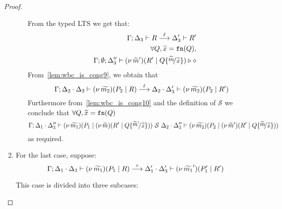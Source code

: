 \begin{proof}
\begin{enumerate}
\begin{enumerate}[i.]
					\noi From the typed LTS we get that:
					\begin{eqnarray}
						& &	\horel{\Gamma}{\Delta_3}{R}{\by{\ell}}{\Delta_3'}{R'}
							\label{lem:wbc_is_cong9} \\
						& &	\forall Q, \widetilde{x} = \fn{Q}, \nonumber\\
						& &	\Gamma; \emptyset; \Delta_3'' \proves \newsp{\widetilde{m}'}{R' \Par Q \subst{\widetilde{m}}{\widetilde{x}}} \hastype \Proc
							\label{lem:wbc_is_cong10}
					\end{eqnarray}
					\noi From~\eqref{lem:wbc_is_cong9}, we obtain that
					\[
						\Gamma; \Delta_2 \cdot \Delta_3 \vdash (\nu\, \widetilde{m_2})(P_2 \;|\; R) \stackrel{\ell}{\longrightarrow} \Delta_2 \cdot \Delta_3' \vdash (\nu\, \widetilde{m_2})(P_2 \;|\; R')
					\]
					\noi Furthermore from~\eqref{lem:wbc_is_cong10} and the definition of $\mathcal{S}$ we conclude that
					$\forall Q, \widetilde{x} = \mathtt{fn}(Q)$
					\[
						\horel{\Gamma}{\Delta_1 \cat \Delta_3''}{\newsp{\widetilde{m_1}}{P_1 \Par \newsp{\widetilde{m}}{R' \Par Q \subst{\widetilde{m}'}{\widetilde{x}}}}}
						{\ \mathcal{S}\ }
						{\Delta_2 \cat \Delta_3''}{\newsp{\widetilde{m_2}}{P_2 \Par \newsp{\widetilde{m}'}{R' \Par Q \subst{\widetilde{m}}{\widetilde{x}}}}}
					\]
					\noi as required.
			\end{enumerate}


	\item For the last case, suppose:
			\[
				\Gamma; \Delta_1 \cdot \Delta_3 \vdash (\nu\, \widetilde{m_1})(P_1 \;|\; R) \stackrel{\tau}{\longrightarrow} \Delta_1' \cdot \Delta_3' \vdash (\nu\, \widetilde{m_1}')(P_1' \;|\; R')
			\]

			\noi This case is divided into three subcases:

			\begin{enumerate}[i.]


\end{enumerate}
\end{enumerate}
\end{proof}
